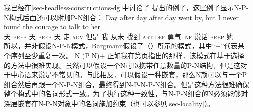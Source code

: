 \begin{exe}
\begin{xlist}[iv.]
\begin{exe}
\begin{xlist}[iv.]
我已经在\ref{sec-headless-constructions-dg}中讨论了 \citet{Bargmann2015a}提出的例子，这些例子显示N-P-N构式后面还可以附加P-N组合：
\ea
\gll Day after day after day went by, but I never found the courage to talk to her.\\
	 天 \textsc{prep} 天 \textsc{prep} 天 走 \textsc{adv} 但是 我 从未 找到 \textsc{art}.\textsc{def} 勇气 \textsc{inf} 说话 \textsc{prep} 她\\
\z
所以，并非假设N-P-N模式，Bargmann假设了（）所示的模式，其中“+”\isce{$+$}{$+$}代表某个序列至少重复一次。
\ea
N (P N)+
\z
正如我在第\pageref{n-p-n-plus-cx}页指出的那样，该模式在基于选择的方法中很难实现。虽然可以假设一个N可以携带任意数量的P-N结构，但是这对于中心语来说是不常见的。与此相反，可以假设一种嵌套，那么N就可以与一个P组合然后再跟一个N-P-N组合，最终得到N-P-N-P-N组合。但是这种方法很难确保整个构式中的名词形式一致。为了执行这种一致性，与N-P-N组合的N必须能够对深层嵌套在N-P-N对象中的名词施加约束（也可以参见\ref{sec-locality}）。


\end{xlist}
\end{exe}
\end{xlist}
\end{exe}
